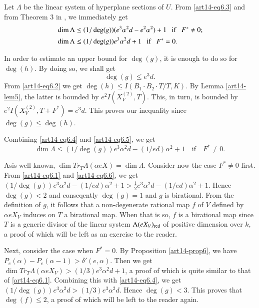 Let $\Lambda$ be the linear system of hyperplane sections of $U$. From \eqref{art14-eq6.3} and from Theorem 3 in \cite{art14-key17}, we immediately get
\begin{align}
& \dim \Lambda \leq (1/\deg (g))(e^{3}\alpha^{2}d-e^{2}\alpha^{2})+1\text{~~ if~~ }F^{*}\neq 0;\notag\\
& \dim \Lambda \leq (1/\deg(g))e^{3}\alpha^{2}d+1\text{~~ if~~ } F^{*}=0.\label{art14-eq6.4}
\end{align}

In order to estimate an upper bound for $\deg(g)$, it is enough to do so for $\deg(h)$. By doing so, we shall get
\begin{equation}
\deg (g)\leq e^{3}d.\label{art14-eq6.5}
\end{equation}
From \eqref{art14-eq6.2} we get $\deg(h)\leq I(B_{1}\cdot B_{2}\cdot T/T,K)$. By Lemma \ref{art14-lem5}, the latter is bounded by $e^{2}I(X^{(2)}_{V},T)$. This, in turn, is bounded by $e^{2}I(X^{(2)}_{V},T+F^{*})=e^{3}d$. This proves our inequality since $\deg(g)\leq \deg(h)$.

Combining \eqref{art14-eq6.4} and \eqref{art14-eq6.5}, we get
\begin{equation}
\dim \Lambda \leq (1/\deg (g))e^{3}\alpha^{2}d-(1/ed)\alpha^{2}+1\text{~~ if~~ } F^{*}\neq 0. \label{art14-eq6.6}
\end{equation}

As\pageoriginale is well known, $\dim Tr_{T}\Lambda(\alpha eX)=\dim \Lambda$. Consider now the case $F^{*}\neq 0$ first. From \eqref{art14-eq6.1} and \eqref{art14-eq6.6}, we get $(1/\deg(g))e^{3}\alpha^{2}d-(1/ed)\alpha^{2}+1>\frac{1}{2}e^{3}\alpha^{2}d-(1/ed)\alpha^{2}+1$. Hence $\deg(g)<2$ and conseqently $\deg(g)=1$  and $g$ is birational. From the definition of $g$, it follows that a non-degenerate rational map $f$ of $V$ defined by $\alpha eX_{V}$ induces on $T$ a birational map. When that is so, $f$ is a birational map since $T$ is a generic divisor of the linear system $\Lambda(eX_{V})_{\operatorname{\mathrm{red}}}$ of positive dimension over $k$, a proof of which will be left as an exercise to the reader.

Next, consider the case when $F^{*}=0$. By Proposition \ref{art14-prop6}, we have $P_{e}(\alpha)-P_{e}(\alpha-1)>\delta'(e,\alpha)$. Then we get $\dim Tr_{T}\Lambda (\alpha eX_{V})>(1/3)e^{3}\alpha^{2}d+1$, a proof of which is quite similar to that of \eqref{art14-eq6.1}. Combining this with \eqref{art14-eq6.4}, we get $(1/\deg (g))e^{3}\alpha^{2}d>(1/3)e^{3}\alpha^{2}d$. Hence $\deg(g)<3$. This proves that $\deg(f)\leq 2$, a proof of which will be left to the reader again.

